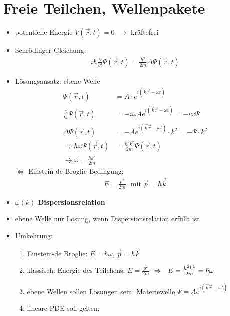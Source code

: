 							\section{Freie Teilchen, Wellenpakete}
							\begin{itemize}
							\item potentielle Energie $V(\vec{r},t)=0~~\rightarrow$ kräftefrei
							\item Schrödinger-Gleichung:
							\begin{align*}
							i\hbar \frac{\partial}{\partial t}\Psi(\vec{r},t)=\frac{\hbar^2}{2m}\Delta\Psi(\vec{r},t)
							\end{align*}
							\item Lösungsansatz: ebene Welle
							\begin{align*}
							\Psi(\vec{r},t)&=A\cdot e^{i(\vec{k}\vec{r}-\omega t)}\\
							\frac{\partial}{\partial t}\Psi(\vec{r},t)&=-i\omega A e^{i(\vec{k}\vec{r}-\omega t)}=-i\omega\Psi\\
							\Delta\Psi(\vec{r},t)&=-Ae^{i(\vec{k}\vec{r}-\omega t)}\cdot k^2=-\Psi\cdot k^2\\
							\Rightarrow \hbar\omega\Psi(\vec{r},t)&=\frac{\hbar^2k^2}{2m}\Psi(\vec{r},t)\\
							\Rrightarrow \boxed{\omega=\frac{\hbar k^2}{2m}}
							\end{align*}
							$\Leftrightarrow$ Einstein-de Broglie-Bedingung:
							\begin{align*}
							E=\frac{p^2}{2m} \text{~~mit~} \vec{p}=\hbar\vec{k}
							\end{align*}
							\item $\omega(k)$ \textbf{Dispersionsrelation}
							\item ebene Welle nur Lösung, wenn Dispersionsrelation erfüllt ist
							\item Umkehrung:
							\begin{enumerate}[start=0]
							\item Einstein-de Broglie: $E=\hbar\omega$, $\vec{p}=\hbar\vec{k}$							
							\item klassisch: Energie des Teilchens: $E=\frac{p^2}{2m}$
							$\\\Rightarrow~~E=\frac{\hbar^2k^2}{2m}=\hbar\omega$
							\item ebene Wellen sollen Lösungen sein: Materiewelle $\Psi=Ae^{i(\vec{k}\vec{r}-\omega t)}$
							\item lineare PDE soll gelten:
							\begin{itemize}

\end{itemize}
\end{enumerate}
\end{itemize}
